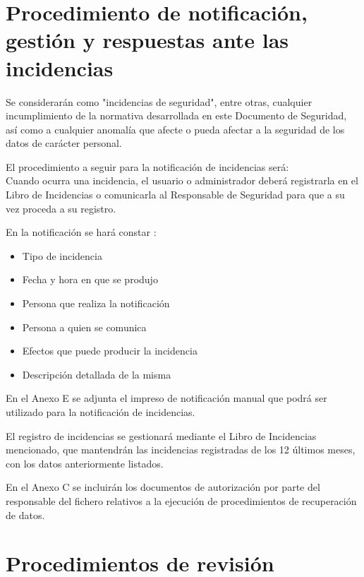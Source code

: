 \documentclass[a4paper,11pt,bibtotoc,noliststotoc]{scrbook}
\begin{document}
\chapter{Procedimiento de notificación, gestión y respuestas ante las incidencias}

Se considerarán como "incidencias de seguridad", entre otras, cualquier incumplimiento de la normativa desarrollada en este Documento de Seguridad, así como a cualquier anomalía que afecte o pueda afectar a la seguridad de los datos de carácter personal.

El procedimiento a seguir para la notificación de incidencias será: \\

Cuando ocurra una incidencia, el usuario o administrador deberá registrarla en el Libro de Incidencias o comunicarla al Responsable de Seguridad para que a su vez proceda a su registro.

En la notificación se hará constar :
\begin{itemize}
\item Tipo de incidencia
\item Fecha y hora en que se produjo
\item Persona que realiza la notificación
\item Persona a quien se comunica
\item Efectos que puede producir la incidencia
\item Descripción detallada de la misma
\end{itemize}

En el Anexo E se adjunta el impreso de notificación manual que podrá ser utilizado para la notificación de incidencias.

El registro de incidencias se gestionará mediante el Libro de Incidencias mencionado, que mantendrán las incidencias registradas de los 12 últimos meses, con los datos anteriormente listados.

En el Anexo C se incluirán los documentos de autorización por parte del responsable del fichero relativos a la ejecución de procedimientos de recuperación de datos.





\chapter{Procedimientos de revisión}
\end{document}
